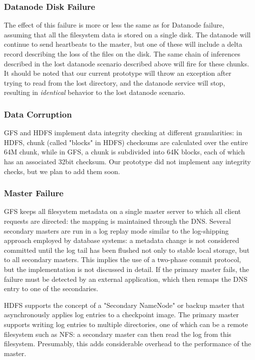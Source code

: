 \documentclass{article}
\begin{document}
\subsubsection{Datanode Disk Failure}
The effect of this failure is more or less the same as for Datanode failure, assuming that all the filesystem data is stored on a single disk.  The datanode will continue to send heartbeats to the master, but one of these will include a delta record describing the loss of the files on the disk.  The same chain of inferences described in the lost datanode scenario described above will fire for these chunks.  It should be noted that our current prototype will throw an exception after trying to read from the lost directory, and the datanode service will stop, resulting in \emph{identical} behavior to the lost datanode scenario.

\subsubsection{Data Corruption}
GFS and HDFS implement data integrity checking at different granularities: in HDFS, chunk (called "blocks" in HDFS) checksums are calculated over the entire 64M chunk, while in GFS, a chunk is subdivided into 64K blocks, each of which has an associated 32bit checksum.  Our prototype did not implement any integrity checks, but we plan to add them soon.

\subsubsection{Master Failure}
 GFS keeps all filesystem metadata on a single master server to which all client requests are directed: the mapping is maintained through the DNS.  Several secondary masters are run in a log replay mode similar to the log-shipping approach employed by database systems: a metadata change is not considered committed until the log tail has been flushed not only to stable local storage, but to all secondary masters.  This implies the use of a two-phase commit protocol, but the implementation is not discussed in detail.  If the primary master fails, the failure must be detected by an external application, which then remaps the DNS entry to one of the secondaries.
 
 HDFS supports the concept of a "Secondary NameNode" or backup master that asynchronously applies  log entries to a checkpoint image.  The primary master supports writing log entries to multiple directories, one of which can be a remote filesystem such as NFS: a secondary master can then read the log from this filesystem.  Presumably, this adds considerable overhead to the performance of the master.
 
\end{document}
